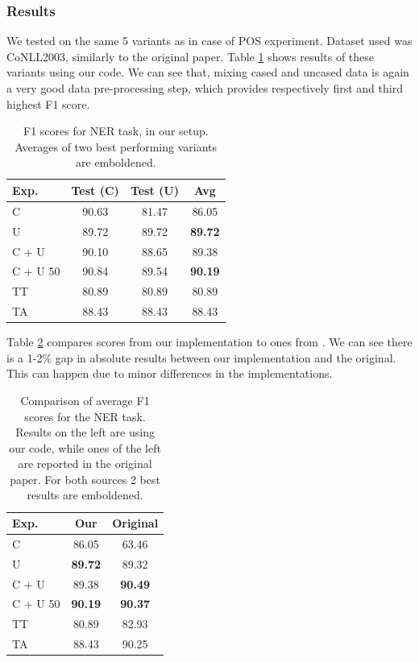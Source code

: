 \documentclass[11pt,a4paper]{article}
\begin{document}
    \subsubsection{Results}
    We tested on the same 5 variants as in case of POS experiment. Dataset used was CoNLL2003, similarly to the original paper. Table \ref{tab:ner-results-our} shows results of these variants using our code. We can see that, mixing cased and uncased data is again a very good data pre-processing step, which provides respectively first and third highest F1 score.

    \begin{table}[h]
        \centering
        \begin{tabular}{|l|c|c|c|}
            \hline
            Exp. & Test (C) & Test (U) & Avg \\
            \hline
            C        & 90.63 & 81.47 & 86.05 \\
            U        & 89.72 & 89.72 & \textbf{89.72} \\
            C + U    & 90.10 & 88.65 & 89.38 \\
            C + U 50 & 90.84 & 89.54 & \textbf{90.19} \\
            TT       & 80.89 & 80.89 & 80.89 \\
            TA       & 88.43 & 88.43 & 88.43 \\
            \hline
        \end{tabular}
        \caption{F1 scores for NER task, in our setup. Averages of two best performing variants are emboldened.}
        \label{tab:ner-results-our}
    \end{table}

    Table \ref{tab:ner-results-comp} compares scores from our implementation to ones from \cite{ner-and-pos-original}. We can see there is a 1-2\% gap in absolute results between our implementation and the original. This can happen due to minor differences in the implementations.

    \begin{table}[h]
        \centering
        \begin{tabular}{|l|c|c|}
            \hline
            Exp. & Our & Original \\
            \hline
            C        & 86.05          & 63.46 \\
            U        & \textbf{89.72} & 89.32 \\
            C + U    & 89.38          & \textbf{90.49} \\
            C + U 50 & \textbf{90.19} & \textbf{90.37} \\
            TT       & 80.89          & 82.93 \\
            TA       & 88.43          & 90.25 \\
            \hline
        \end{tabular}
        \caption{Comparison of average F1 scores for the NER task. Results on the left are using our code, while ones of the left are reported in the original paper. For both sources 2 best results are emboldened.}
        \label{tab:ner-results-comp}
    \end{table}
\end{document}
